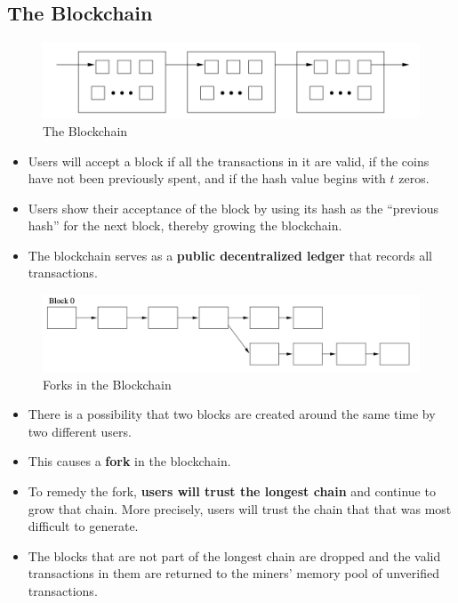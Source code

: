 \documentclass[12pt,titlepage]{article}
\begin{document}
\subsection{The Blockchain}
\begin{center}
	\begin{figure}[h!]
		\centering
		\includegraphics[width=\textwidth]{The_Blockchain.png}
		\caption{The Blockchain}
	\end{figure}
\end{center}
\begin{itemize}
	\item Users will accept a block if all the transactions in it are valid, if the coins have not been previously spent, and if the hash value begins with $t$ zeros.
	\item Users show their acceptance of the block by using its hash as the ``previous hash'' for the next block, thereby growing the blockchain.
	\item The blockchain serves as a \textbf{public decentralized ledger} that records all transactions.
\end{itemize}
\begin{center}
	\begin{figure}[h!]
		\centering
		\includegraphics[width=\textwidth]{Forks_in_the_Blockchain.png}
		\caption{Forks in the Blockchain}
	\end{figure}
\end{center}
\begin{itemize}
	\item There is a possibility that two blocks are created around the same time by two different users.
	\item This causes a \textbf{fork} in the blockchain.
	\item To remedy the fork, \textbf{users will trust the longest chain} and continue to grow that chain. More precisely, users will trust the chain that that was most difficult to generate.
	\item The blocks that are not part of the longest chain are dropped and the valid transactions in them are returned to the miners’ memory pool of unverified transactions.
\end{itemize}
\end{document}
